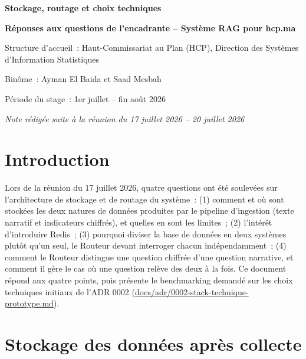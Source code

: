 \documentclass[11pt,a4paper]{article}
\begin{document}
\begin{titlepage}
\centering
\vspace*{2cm}
{\Huge\bfseries\color{navy} Stockage, routage et choix techniques\par}
\vspace{0.5cm}
{\Large\bfseries\color{gold} R\'eponses aux questions de l'encadrante -- Syst\`eme RAG pour hcp.ma\par}
\vspace{1.5cm}
{\large\color{greytext} Structure d'accueil~: Haut-Commissariat au Plan (HCP), Direction des Syst\`emes d'Information Statistiques\par}
\vspace{0.3cm}
{\large\color{greytext} Bin\^ome~: Ayman El Baida et Saad Mesbah\par}
\vspace{0.3cm}
{\large\color{greytext} P\'eriode du stage~: 1er juillet -- fin ao\^ut 2026\par}
\vspace{0.3cm}
{\large\itshape\color{greytext} Note r\'edig\'ee suite \`a la r\'eunion du 17 juillet 2026 -- 20 juillet 2026\par}
\vfill
\end{titlepage}

\tableofcontents
\newpage

\section{Introduction}
Lors de la r\'eunion du 17 juillet 2026, quatre questions ont \'et\'e soulev\'ees sur l'architecture de stockage et de routage du syst\`eme~: (1) comment et o\`u sont stock\'ees les deux natures de donn\'ees produites par le pipeline d'ingestion (texte narratif et indicateurs chiffr\'es), et quelles en sont les limites~; (2) l'int\'er\^et d'introduire Redis~; (3) pourquoi diviser la base de donn\'ees en deux syst\`emes plut\^ot qu'un seul, le Routeur devant interroger chacun ind\'ependamment~; (4) comment le Routeur distingue une question chiffr\'ee d'une question narrative, et comment il g\`ere le cas o\`u une question rel\`eve des deux \`a la fois. Ce document r\'epond aux quatre points, puis pr\'esente le benchmarking demand\'e sur les choix techniques initiaux de l'ADR 0002 (\url{docs/adr/0002-stack-technique-prototype.md}).

\section{Stockage des donn\'ees apr\`es collecte}
\end{document}
